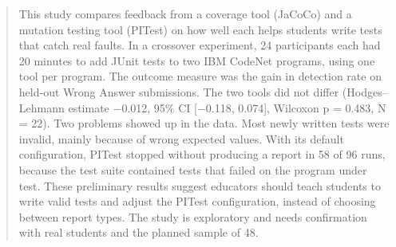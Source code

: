 \begin{abstract}
This study compares feedback from a coverage tool (JaCoCo) and a mutation testing tool (PITest) on how well each helps students write tests that catch real faults. In a crossover experiment, 24 participants each had 20 minutes to add JUnit tests to two IBM CodeNet programs, using one tool per program. The outcome measure was the gain in detection rate on held-out Wrong Answer submissions. The two tools did not differ (Hodges--Lehmann estimate $-$0.012, 95\% CI [$-$0.118, 0.074], Wilcoxon p = 0.483, N = 22). Two problems showed up in the data. Most newly written tests were invalid, mainly because of wrong expected values. With its default configuration, PITest stopped without producing a report in 58 of 96 runs, because the test suite contained tests that failed on the program under test. These preliminary results suggest educators should teach students to write valid tests and adjust the PITest configuration, instead of choosing between report types. The study is exploratory and needs confirmation with real students and the planned sample of 48.
\end{abstract}
